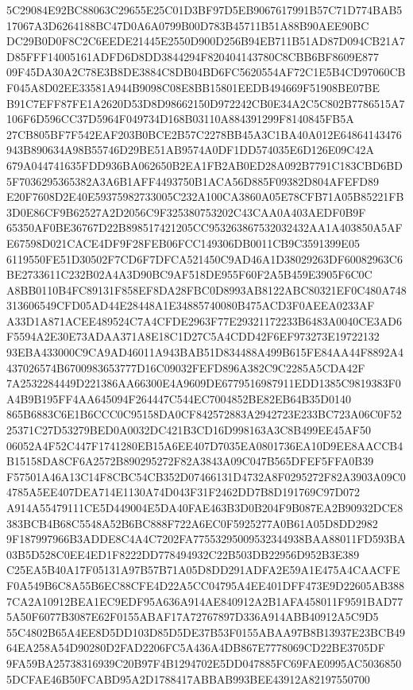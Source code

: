 \documentclass[UTF8,fontset=fandol,zihao=-4,a4paper]{ctexart}
\begin{document}
{{5C29084E92BC88063C29655E25C01D3BF97D5EB9067617991B57C71D774BAB517067A3D6264188BC47D0A6A0799B00D783B45711B51A88B90AEE90BC
DC29B0D0F8C2C6EEDE21445E2550D900D256B94EB711B51AD87D094CB21A7D85FFF14005161ADFD6D8DD3844294F820404143780C8CBB6BF8609E877
09F45DA30A2C78E3B8DE3884C8DB04BD6FC5620554AF72C1E5B4CD97060CBF045A8D02EE33581A944B9098C08E8BB15801EEDB494669F51908BE07BE
B91C7EFF87FE1A2620D53D8D98662150D972242CB0E34A2C5C802B7786515A7106F6D596CC37D5964F049734D168B03110A884391299F8140845FB5A
27CB805BF7F542EAF203B0BCE2B57C2278BB45A3C1BA40A012E64864143476943B890634A98B55746D29BE51AB9574A0DF1DD574035E6D126E09C42A
679A044741635FDD936BA062650B2EA1FB2AB0ED28A092B7791C183CBD6BD5F7036295365382A3A6B1AFF4493750B1ACA56D885F09382D804AFEFD89
E20F7608D2E40E59375982733005C232A100CA3860A05E78CFB71A05B85221FB3D0E86CF9B62527A2D2056C9F325380753202C43CAA0A403AEDF0B9F
65350AF0BE36767D22B898517421205CC953263867532032432AA1A403850A5AFE67598D021CACE4DF9F28FEB06FCC149306DB0011CB9C3591399E05
6119550FE51D30502F7CD6F7DFCA521450C9AD46A1D38029263DF60082963C6BE2733611C232B02A4A3D90BC9AF518DE955F60F2A5B459E3905F6C0C
A8BB0110B4FC89131F858EF8DA28FBC0D8993AB8122ABC80321EF0C480A748313606549CFD05AD44E28448A1E34885740080B475ACD3F0AEEA0233AF
A33D1A871ACEE489524C7A4CFDE2963F77E29321172233B6483A0040CE3AD6F5594A2E30E73ADAA371A8E18C1D27C5A4CDD42F6EF973273E19722132
93EBA433000C9CA9AD46011A943BAB51D834488A499B615FE84AA44F8892A4437026574B6700983653777D16C09032FEFD896A382C9C2285A5CDA42F
7A2532284449D221386AA66300E4A9609DE6779516987911EDD1385C9819383F0A4B9B195FF4AA645094F264447C544EC7004852BE82EB64B35D0140
865B6883C6E1B6CCC0C95158DA0CF842572883A2942723E233BC723A06C0F5225371C27D53279BED0A0032DC421B3CD16D998163A3C8B499EE45AF50
06052A4F52C447F1741280EB15A6EE407D7035EA0801736EA10D9EE8AACCB4B15158DA8CF6A2572B890295272F82A3843A09C047B565DFEF5FFA0B39
F57501A46A13C14F8CBC54CB352D07466131D4732A8F0295272F82A3903A09C04785A5EE407DEA714E1130A74D043F31F2462DD7B8D191769C97D072
A914A55479111CE5D449004E5DA40FAE463B3D0B204F9B087EA2B90932DCE8383BCB4B68C5548A52B6BC888F722A6EC0F5925277A0B61A05D8DD2982
9F187997966B3ADDE8C4A4C7202FA77553295009532344938BAA88011FD593BA03B5D528C0EE4ED1F8222DD778494932C22B503DB22956D952B3E389
C25EA5B40A17F05131A97B57B71A05D8DD291ADFA2E59A1E475A4CAACFEF0A549B6C8A55B6EC88CFE4D22A5CC04795A4EE401DFF473E9D22605AB388
7CA2A10912BEA1EC9EDF95A636A914AE840912A2B1AFA458011F9591BAD775A50F6077B3087E62F0155ABAF17A72767897D336A914ABB40912A5C9D5
55C4802B65A4EE8D5DD103D85D5DE37B53F0155ABAA97B8B13937E23BCB4964EA258A54D90280D2FAD2206FC5A436A4DB867E7778069CD22BE3705DF
9FA59BA25738316939C20B97F4B1294702E5DD047885FC69FAE0995AC50368505DCFAE46B50FCABD95A2D1788417ABBAB993BEE43912A82197550700
}}
\end{document}

